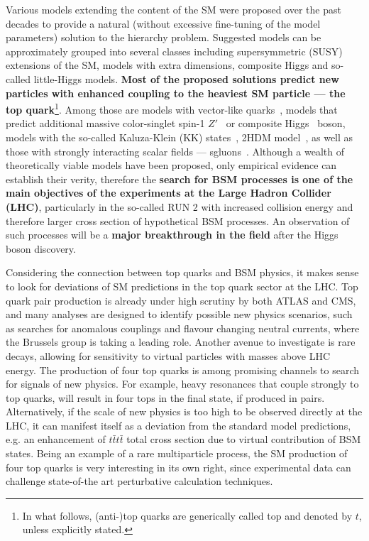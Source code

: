 \textcolor{\mycolor}{
Various models extending the content of the SM were proposed over the past decades to provide a natural (without excessive fine-tuning of the model parameters) solution to the hierarchy problem. Suggested models can be approximately grouped into several classes including supersymmetric (SUSY) extensions of the SM, models with extra dimensions, composite Higgs and so-called little-Higgs models. \textbf{Most of the proposed solutions predict new particles with enhanced coupling to the heaviest SM particle --- the top quark}\footnote{In what follows, (anti-)top quarks are generically called top and denoted by $t$, unless explicitly stated.}. Among those are models with vector-like quarks~\cite{Aguilar-Saavedra:2013qpa}, models that predict additional massive color-singlet spin-1 $Z'$~\cite{Langacker:2008yv} or composite Higgs~\cite{Agashe:2004rs} boson, models with the so-called Kaluza-Klein (KK) states~\cite{Agashe:2006hk,Davoudiasl:1999jd}, 2HDM model~\cite{Dicus:1994bm,Craig:2015jba,Craig:2016ygr}, as well as those with strongly interacting scalar fields --- sgluons~\cite{Plehn:2008ae,GoncalvesNetto:2012nt}. Although a wealth of theoretically viable models have been proposed, only empirical evidence can establish their verity, therefore the \textbf{search for BSM processes is one of the main objectives of the experiments at the Large Hadron Collider (LHC)}, particularly in the so-called RUN 2 with increased collision energy and therefore larger cross section of hypothetical BSM processes. An observation of such processes will be a \textbf{major breakthrough in the field} after the Higgs boson discovery.}

\textcolor{\mynew}{
Considering the connection between top quarks and BSM physics, it makes sense to look for deviations of SM predictions in the top quark sector at the LHC. Top quark pair production is already under high scrutiny by both ATLAS and CMS, and many analyses are designed to identify possible new physics scenarios, such as searches for anomalous couplings and flavour changing neutral currents, where the Brussels group is taking a leading role. Another avenue to investigate is rare decays, allowing for sensitivity to virtual particles with masses above LHC energy. The production of four top quarks is among promising channels to search for signals of new physics. For example, heavy resonances that couple strongly to top quarks, will result in four tops in the final state, if produced in pairs. Alternatively, if the scale of new physics is too high to be observed directly at the LHC, it can manifest itself as a deviation from the standard model predictions, e.g. an enhancement of $t\bar{t}t\bar{t}$ total cross section due to virtual contribution of BSM states. Being an example of a rare multiparticle process, the SM production of four top quarks is very interesting in its own right, since experimental data can challenge state-of-the art perturbative calculation techniques.
}

